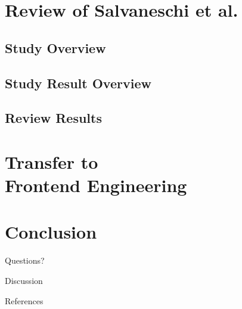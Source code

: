 \documentclass{beamer}
\begin{document}
\section{Review of Salvaneschi et al.}

\subsection{Study Overview}

\subsection{Study Result Overview}

\subsection{Review Results}

\section{Transfer to\\Frontend Engineering}

\begin{frame}

\end{frame}


\section{Conclusion}
\begin{frame}[focus]
	Questions?
\end{frame}

\begin{frame}[focus]
	Discussion
\end{frame}

\appendix
\begin{frame}{References}
	
	
\end{frame}
\end{document}
